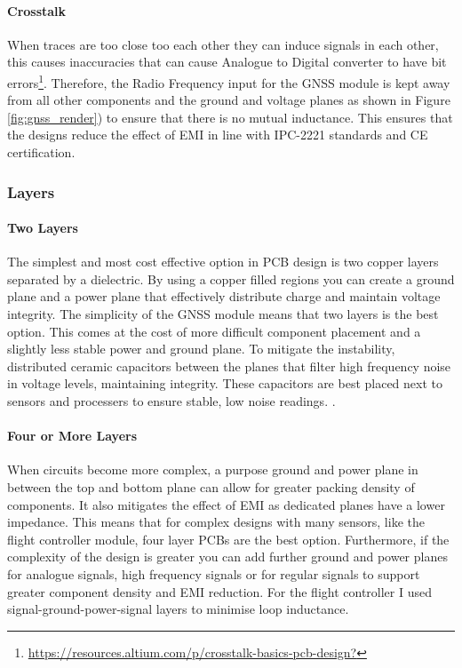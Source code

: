 \paragraph{Crosstalk}
When traces are too close too each other they can induce signals in each other, this causes inaccuracies that can cause Analogue to Digital converter to have bit errors\footnote{\url{https://resources.altium.com/p/crosstalk-basics-pcb-design?}}. Therefore, the Radio Frequency input for the \gls{GNSS} module is kept away from all other components and the ground and voltage planes as shown in Figure \ref{fig:gnss_render}) to ensure that there is no mutual inductance. This ensures that the designs reduce the effect of \gls{EMI} in line with IPC-2221 standards and CE certification.

\subsubsection{Layers}\label{sub_sub_section:tgt_layers}
\paragraph{Two Layers}
The simplest and most cost effective option in \gls{PCB} design is two copper layers separated by a dielectric. By using a copper filled regions you can create a ground plane and a power plane that effectively distribute charge and maintain voltage integrity. The simplicity of the \gls{GNSS} module means that two layers is the best option. This comes at the cost of more difficult component placement and a slightly less stable power and ground plane. To mitigate the instability, distributed ceramic capacitors between the planes that filter high frequency noise in voltage levels, maintaining integrity. These capacitors are best placed next to sensors and processers to ensure stable, low noise readings. .
\paragraph{Four or More Layers}
When circuits become more complex, a purpose ground and power plane in between the top and bottom plane can allow for greater packing density of components. It also mitigates the effect of \gls{EMI} as dedicated planes have a lower impedance. This means that for complex designs with many sensors, like the flight controller module, four layer \gls{PCB}s are the best option. Furthermore, if the complexity of the design is greater you can add further ground and power planes for analogue signals, high frequency signals or for regular signals to support greater component density and \gls{EMI} reduction. For the flight controller I used signal-ground-power-signal layers to minimise loop inductance.

